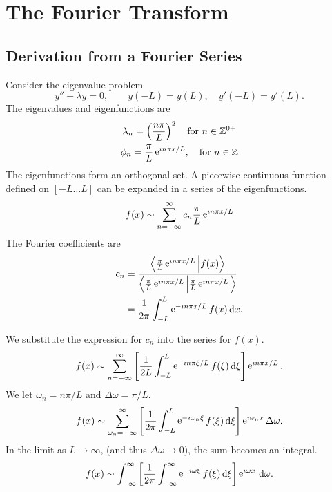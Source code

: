 \flushbottom




\chapter{The Fourier Transform}






\section{Derivation from a Fourier Series}

Consider the eigenvalue problem
\[ 
y'' + \lambda y = 0, \qquad y(-L) = y(L), \quad y'(-L) = y'(L).
\]
The eigenvalues and eigenfunctions are
\begin{gather*}
  \lambda_n = \left(\frac{n \pi}{L}\right)^2 \quad \mathrm{for}\ n \in \mathbb{Z}^{0+} \\
  \phi_n = \frac{\pi}{L} \mathop{\mathrm{e}}\nolimits^{\imath n \pi x / L}, \quad \mathrm{for}\ n \in \mathbb{Z}
\end{gather*}
The eigenfunctions form an orthogonal set.  A piecewise continuous
function defined on $[-L \ldots L]$ can be expanded in a series of the
eigenfunctions.
\[ 
f(x) \sim \sum_{n = - \infty}^\infty c_n \frac{\pi}{L} \mathop{\mathrm{e}}\nolimits^{\imath n \pi x / L}
\]
The Fourier coefficients are
\begin{align*}
  c_n     &= \frac{\Big\langle \frac{\pi}{L} \mathop{\mathrm{e}}\nolimits^{\imath n \pi x / L} \Big| f(x) \Big\rangle}
  {\Big\langle \frac{\pi}{L} \mathop{\mathrm{e}}\nolimits^{\imath n \pi x / L} \Big| \frac{\pi}{L}
    \mathop{\mathrm{e}}\nolimits^{\imath n \pi x / L} \Big\rangle} \\
  &= \frac{1}{2\pi} \int_{-L}^L \mathop{\mathrm{e}}\nolimits^{-\imath n \pi x / L} f(x)\,\mathrm{d} x.
\end{align*}

We substitute the expression for $c_n$ into the series for $f(x)$.
\[ 
f(x) \sim \sum_{n = - \infty}^\infty \left[\frac{1}{2L} \int_{-L}^L \mathop{\mathrm{e}}\nolimits^{-\imath n \pi \xi / L} 
  f(\xi)\, \mathrm{d} \xi \right] \mathop{\mathrm{e}}\nolimits^{\imath n \pi x / L}.
\]
We let $\omega_n = n \pi / L$ and $\Delta \omega = \pi / L$.
\[ 
f(x) \sim \sum_{\omega_n = -\infty}^\infty \left[ \frac{1}{2\pi}
  \int_{-L}^L \mathop{\mathrm{e}}\nolimits^{-\imath \omega_n \xi} f(\xi) \,\mathrm{d} \xi \right] \mathop{\mathrm{e}}\nolimits^{\imath \omega_n x} \Delta \omega.
\]
In the limit as $L \to \infty$, (and thus $\Delta \omega \to 0$), the sum becomes an 
integral.
\[ 
f(x) \sim \int_{-\infty}^\infty \left[ \frac{1}{2\pi} \int_{-\infty}^\infty
  \mathop{\mathrm{e}}\nolimits^{-\imath \omega \xi} f(\xi)\,\mathrm{d} \xi \right] \mathop{\mathrm{e}}\nolimits^{\imath \omega x}\,\mathrm{d} \omega.
\]

